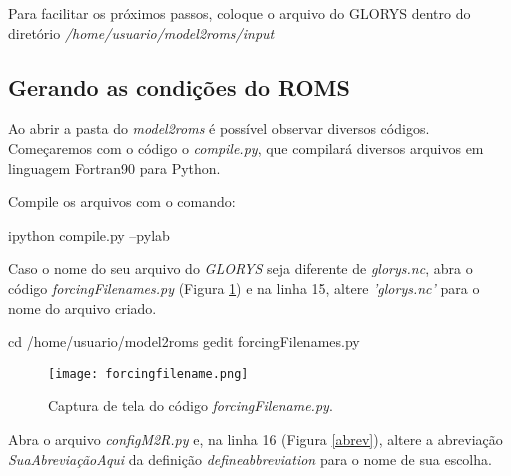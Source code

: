\begin{tcolorbox}[enhanced,
    grow to left by   = 0cm,
    grow to right by  = 0cm,
    enlarge top by    = 0cm,
    enlarge bottom by = 0cm,
    tcbox raise base,
    boxrule           = 1.0pt,
    left              = 18mm,
    colframe          = red!50!black,coltext=red!25!black,colback=red!10!white,
    overlay           = {\begin{tcbclipinterior}\fill[red!75!blue!50!white] (frame.south west)
      rectangle node[text=white,font=\sffamily\bfseries\footnotesize,rotate=0] {ATENÇÃO} ([xshift=18mm]frame.north west);\end{tcbclipinterior}}]
  Para facilitar os próximos passos, coloque o arquivo do GLORYS dentro do diretório \textit{/home/usuario/model2roms/input}
\end{tcolorbox}

\subsection{Gerando as condições do ROMS}
\bigskip

\noindent Ao abrir a pasta do \textit{model2roms} é possível observar diversos códigos. Começaremos com o código o \textit{compile.py}, que compilará diversos arquivos em linguagem Fortran90 para Python.
\bigskip

\noindent Compile os arquivos com o comando:
\bigskip

\begin{bashcode}
ipython compile.py --pylab
\end{bashcode}
\bigskip

\noindent Caso o nome do seu arquivo do \textit{GLORYS} seja diferente de \textit{glorys.nc}, abra o código \textit{forcingFilenames.py} (Figura \textcolor{bleu_cite}{\ref{forcingfilename}}) e na linha 15, altere \textit{'glorys.nc'} para o nome do arquivo criado.
\bigskip

\begin{bashcode}
cd /home/usuario/model2roms
gedit forcingFilenames.py
\end{bashcode}
\bigskip

\begin{figure}[H]
    \centering
    \texttt{[image: forcingfilename.png]}
    \caption{Captura de tela do código \textit{forcingFilename.py}.}
    \label{forcingfilename}
\end{figure}
\bigskip

\noindent Abra o arquivo \textit{configM2R.py} e, na linha 16 (Figura \textcolor{bleu_cite}{\ref{abrev}}), altere a abreviação \textit{SuaAbreviaçãoAqui} da definição \textit{defineabbreviation} para o nome de sua escolha.
\bigskip


